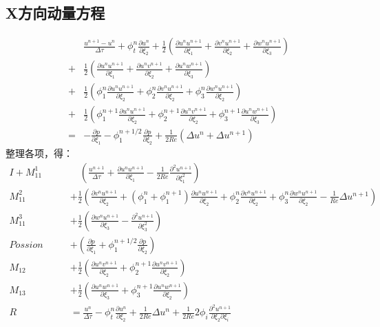 \documentclass{ctexart}
\begin{document}
	\subsection{X方向动量方程}
	\begin{equation}
	\begin{split}
	&\frac{u^{n+1} - u^n}{\varDelta\tau} + \phi_t^n\frac{\partial u^n}{\partial \xi_2} + \frac{1}{2}(\frac{\partial u^nu^{n+1}}{\partial\xi_1} + \frac{\partial v^nu^{n+1}}{\partial\xi_2} + \frac{\partial w^nu^{n+1}}{\partial\xi_3}) \\+& \frac{1}{2}(\frac{\partial u^nu^{n+1}}{\partial\xi_1}+\frac{\partial u^nv^{n+1}}{\partial \xi_2} + \frac{\partial u^nw^{n+1}}{\partial\xi_3}) \\+& \frac{1}{2}(\phi_1^n\frac{\partial u^nu^{n+1}}{\partial\xi_2} + \phi_2^n\frac{\partial v^nu^{n+1}}{\partial\xi_2} + \phi_3^n\frac{\partial w^nu^{n+1}}{\partial\xi_2}) \\+& \frac{1}{2}(\phi_1^{n+1}\frac{\partial u^nu^{n+1}}{\partial\xi_2} + \phi_2^{n+1}\frac{\partial u^nv^{n+1}}{\partial\xi_2} + \phi_3^{n+1}\frac{\partial u^nw^{n+1}}{\partial\xi_3}) \\=& -\frac{\partial p}{\partial \xi_1} - \phi_1^{n+1/2}\frac{\partial p}{\partial \xi_2} + \frac{1}{2Re}(\varDelta u^n + \varDelta u^{n+1})
	\end{split}
	\end{equation}
	整理各项，得：
	\begin{equation}
	\begin{split}
	I + M_{11}^1 \qquad &\quad (\frac{u^{n+1}}{\varDelta\tau} + \frac{\partial u^nu^{n+1}}{\partial\xi_1} - \frac{1}{2Re}\frac{\partial^2u^{n+1}}{\partial\xi_1^2})\\
	M_{11}^2 \qquad & +\frac{1}{2}(\frac{\partial v^nu^{n+1}}{\partial \xi_2} + (\phi_1^n + \phi_1^{n+1})\frac{\partial u^nu^{n+1}}{\partial \xi_2} + \phi_2^n\frac{\partial v^nu^{n+1}}{\partial\xi_2} + \phi_3^n\frac{\partial w^nu^{n+1}}{\partial\xi_2} -\frac{1}{Re}\varDelta u^{n+1})\\
	M_{11}^3 \qquad & +\frac{1}{2}(\frac{\partial w^nu^{n+1}}{\partial\xi_3} - \frac{\partial^2u^{n+1}}{\partial\xi_3^2})\\
	Possion \qquad & +(\frac{\partial p}{\partial\xi_1} + \phi_1^{n+1/2}\frac{\partial p}{\partial\xi_2})\\
	M_{12} \qquad & +\frac{1}{2}(\frac{\partial u^nv^{n+1}}{\partial\xi_2} + \phi_2^{n+1}\frac{\partial u^nv^{n+1}}{\partial\xi_2})\\
	M_{13} \qquad & +\frac{1}{2}(\frac{\partial u^nw^{n+1}}{\partial\xi_3} + \phi_3^{n+1}\frac{\partial u^nw^{n+1}}{\partial\xi_2})\\
	R \qquad & = \frac{u^n}{\varDelta\tau} - \phi_t^n\frac{\partial u^n}{\partial\xi_2} + \frac{1}{2Re}\varDelta u^n + \frac{1}{2Re}2\phi_i\frac{\partial^2u^{n+1}}{\partial\xi_2\partial\xi_i}
	\end{split}
	\end{equation}
\end{document}

